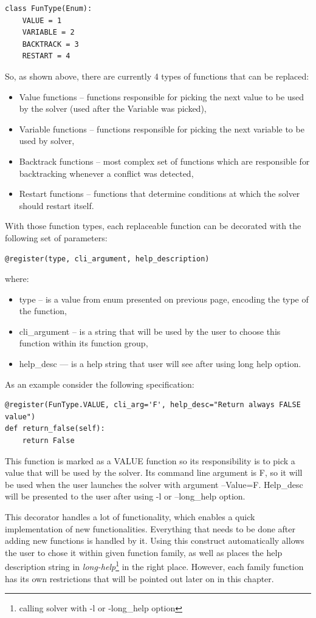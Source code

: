 \documentclass[12pt,english,pdflatex]{aghdpl}
\begin{document}
\begin{lstlisting}
class FunType(Enum):     
	VALUE = 1
	VARIABLE = 2
	BACKTRACK = 3
	RESTART = 4
\end{lstlisting}
So, as shown above, there are currently 4 types of functions that can
be replaced:
\begin{itemize}
\item Value functions -- functions responsible for picking the next value to
be used by the solver (used after the Variable was picked),
\item Variable functions -- functions responsible for picking the next variable
to be used by solver,
\item Backtrack functions -- most complex set of functions which are responsible
for backtracking whenever a conflict was detected,
\item Restart functions -- functions that determine conditions at which the solver should
restart itself.
\end{itemize}
With those function types, each replaceable function can be decorated
with the following set of  parameters:
\begin{lstlisting}
@register(type, cli_argument, help_description)
\end{lstlisting}
where:
\begin{itemize}
\item type -- is a value from enum presented on previous page, encoding the type of the function,
\item cli\_argument -- is a string that will be used by the user to choose this
function within its function group,
\item help\_desc --- is a help string
that user will see after using long help option.
\end{itemize}
As an example consider the following specification:
\begin{lstlisting}
@register(FunType.VALUE, cli_arg='F', help_desc="Return always FALSE value") 
def return_false(self):         
	return False
\end{lstlisting}
This function is marked as a VALUE function so its responsibility is
to pick a value that will be used by the solver. Its command line
argument is F, so it will be used when the user launches the solver with argument
–Value=F. Help\_desc will be presented to the user after using -l or –long\_help
option.

This decorator handles a lot of functionality, which enables a
quick implementation of new functionalities. Everything that needs
to be done after adding new functions is handled by it. Using this
construct automatically allows the user to chose it within given function
family, as well as places the help description string in \textit{long-help}\footnote{calling solver with -l or -long\_help option} in the right place.
However, each family function has its own restrictions that will be
pointed out later on  in this chapter.
\end{document}
